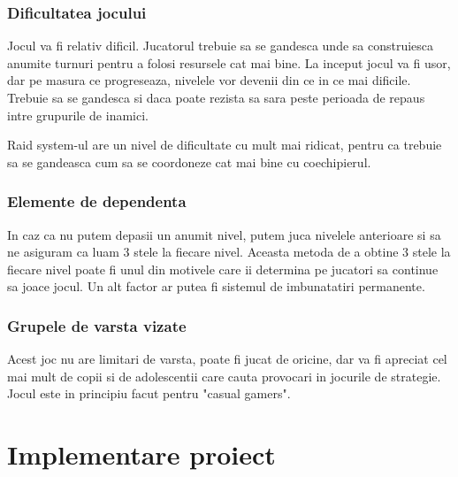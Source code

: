 \documentclass[12pt, a4paper]{article}
\begin{document}
	
	
	
	
	\subsubsection{Dificultatea jocului}
	
	Jocul va fi relativ dificil. Jucatorul trebuie sa se gandesca unde sa construiesca anumite turnuri pentru a folosi resursele cat mai bine. La inceput jocul va fi usor, dar pe masura ce progreseaza, nivelele vor devenii din ce in ce mai dificile. Trebuie sa se gandesca si daca poate rezista sa sara peste perioada de repaus intre grupurile de inamici.
	\newline
	
	Raid system-ul are un nivel de dificultate cu mult mai ridicat, pentru ca trebuie sa se gandeasca cum sa se coordoneze cat mai bine cu coechipierul.
	
	
	
	
	
	\subsubsection{Elemente de dependenta}
	
	In caz ca nu putem depasii un anumit nivel, putem juca nivelele anterioare si sa ne asiguram ca luam 3 stele la fiecare nivel. Aceasta metoda de a obtine 3 stele la fiecare nivel poate fi unul din motivele care ii determina pe jucatori sa continue sa joace jocul. Un alt factor ar putea fi sistemul de imbunatatiri permanente.
	
	
	
	
	
	\subsubsection{Grupele de varsta vizate}
	
	Acest joc nu are limitari de varsta, poate fi jucat de oricine, dar va fi apreciat cel mai mult de copii si de adolescentii care cauta provocari in jocurile de strategie. Jocul este in principiu facut pentru "casual gamers".
	
	
	
	
	
	\section{Implementare proiect}
	
	
	
\end{document}
